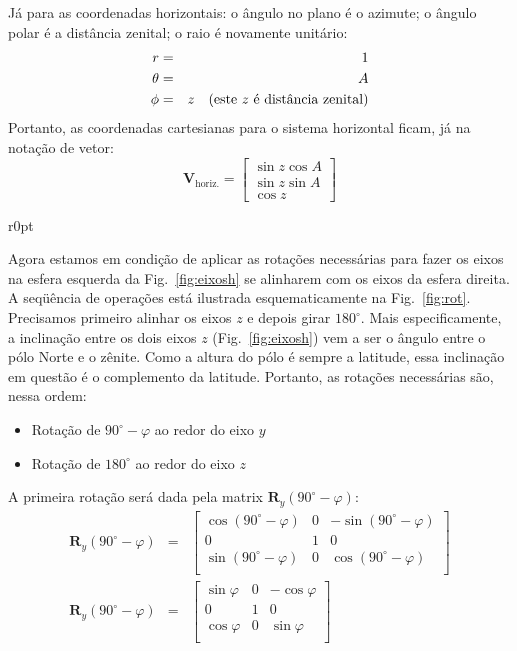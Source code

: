 Já para as coordenadas horizontais: o ângulo no plano é o azimute; o ângulo polar é a distância zenital; o raio é novamente unitário:
%
\begin{eqnarray}
r &=& 1 \\
\theta &=& A \\
\phi &=& z \text{\quad(este $z$ é distância zenital)}
\end{eqnarray}
%
Portanto, as coordenadas cartesianas para o sistema horizontal ficam, já na notação de vetor:
%
\begin{equation}
\textbf{V}_\text{horiz.} =
\begin{bmatrix}
\sin z \cos A \\
\sin z \sin A \\
\cos z
\end{bmatrix}
\end{equation}

\begin{wrapfigure}{r}{0pt}
\centering



\caption{Rotações para alinhar os eixos da Fig.~\ref{fig:eixosh}.}
\label{fig:rot}
\end{wrapfigure}
%
Agora estamos em condição de aplicar as rotações necessárias para fazer os eixos na esfera esquerda da Fig.~\ref{fig:eixosh} se alinharem com os eixos da esfera direita. A seqüência de operações está ilustrada esquematicamente na Fig.~\ref{fig:rot}. Precisamos primeiro alinhar os eixos $z$ e depois girar $180^{\circ}$. Mais especificamente, a inclinação entre os dois eixos $z$ (Fig.~\ref{fig:eixosh}) vem a ser o ângulo entre o pólo Norte e o zênite. Como a altura do pólo é sempre a latitude, essa inclinação em questão é o complemento da latitude. Portanto, as rotações necessárias são, nessa ordem:
%
\begin{itemize}
\item[(i)] Rotação de $90^{\circ} - \varphi$ ao redor do eixo $y$
\item[(ii)] Rotação de $180^{\circ}$ ao redor do eixo $z$
\end{itemize}
%
A primeira rotação será dada pela matrix $\textbf{R}_y(90^{\circ} - \varphi)$:
%
\begin{eqnarray}
\textbf{R}_y(90^{\circ} - \varphi) &=& 
\begin{bmatrix}
\cos(90^{\circ} - \varphi) & 0 & -\sin(90^{\circ} - \varphi) \\
0 & 1 & 0 \\
\sin(90^{\circ} - \varphi) & 0 & \cos(90^{\circ} - \varphi) \\ 
\end{bmatrix}\\
\textbf{R}_y(90^{\circ} - \varphi) &=& 
\begin{bmatrix}
\sin \varphi & 0 & -\cos \varphi \\
0 & 1 & 0 \\
\cos \varphi & 0 & \sin \varphi \\ 
\end{bmatrix}
\end{eqnarray}

